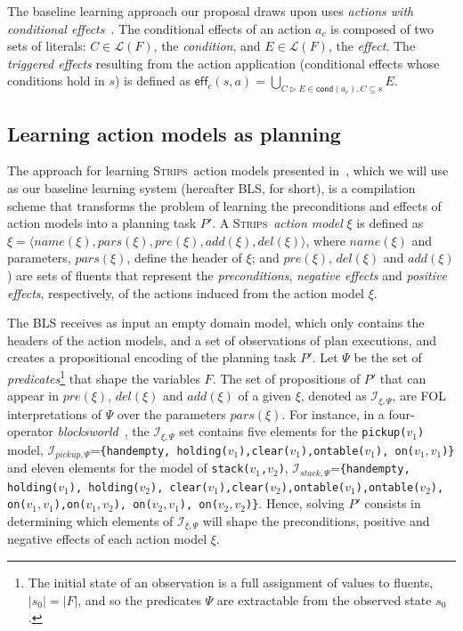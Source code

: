 \documentclass{article}
\newcommand{\tup}[1]{{\langle #1 \rangle}}
\newcommand{\eff}{\mathsf{eff}}     %
\newcommand{\cond}{\mathsf{cond}}   %
\newcommand{\strips}{\textsc{Strips}}
\begin{document}
The baseline learning approach our proposal draws upon uses {\em actions with conditional effects}~\cite{aineto2018learning}. The conditional effects of an action $a_c$ is composed of two sets of literals: $C\in\mathcal{L}(F)$, the {\em condition}, and $E\in\mathcal{L}(F)$, the {\em effect}. The {\em triggered effects} resulting from the action application (conditional effects whose conditions hold in $s$) is defined as $\eff_c(s,a)=\bigcup_{C\rhd E\in\cond(a_c),C\subseteq s} E$.


\subsection{Learning action models as planning}
\label{FAMA}

The approach for learning \strips\ action models presented in~\cite{aineto2018learning}, which we will use as our baseline learning system (hereafter BLS, for short), is a compilation scheme that transforms the problem of learning the preconditions and effects of action models into a planning task $P'$. A \strips\ \emph{action model} $\xi$ is defined as $\xi=\tup{name(\xi),pars(\xi),pre(\xi),add(\xi),del(\xi)}$, where $name(\xi)$ and parameters, $pars(\xi)$, define the header of $\xi$; and $pre(\xi)$, $del(\xi)$ and $add(\xi)$) are sets of fluents that represent the {\em preconditions}, {\em negative effects} and {\em positive effects}, respectively, of the actions induced from the action model $\xi$.

The BLS receives as input an empty domain model, which only contains the headers of the action models, and a set of observations of plan executions, and creates a propositional encoding of the planning task $P'$. Let $\Psi$ be the set of {\em predicates}\footnote{The initial state of an observation is a full assignment of values to fluents, $|s_0|=|F|$, and so the predicates $\Psi$ are extractable from the observed state $s_0$.} that shape the variables $F$. The set of propositions of $P'$ that can appear in $pre(\xi)$, $del(\xi)$ and $add(\xi)$ of a given $\xi$, denoted as ${\mathcal I}_{\xi,\Psi}$, are FOL interpretations of $\Psi$ over the parameters $pars(\xi)$. For instance, in a four-operator {\em blocksworld}~\cite{slaney2001blocks}, the ${\mathcal I}_{\xi,\Psi}$ set contains five elements for the {\small \tt pickup($v_1$)} model, ${\mathcal I}_{pickup,\Psi}$={\small\tt\{handempty, holding($v_1$),clear($v_1$),ontable($v_1$), on($v_1,v_1$)\}} and eleven elements for the model of {\small \tt stack($v_1$,$v_2$)}, ${\mathcal I}_{stack,\Psi}$={\small\tt\{handempty, holding($v_1$), holding($v_2$), clear($v_1$),clear($v_2$),ontable($v_1$),ontable($v_2$), \\
on($v_1,v_1$),on($v_1,v_2$), on($v_2,v_1$), on($v_2,v_2$)\}}. Hence, solving $P'$ consists in determining which elements of ${\mathcal I}_{\xi,\Psi}$ will shape the preconditions, positive and negative effects of each action model $\xi$.
\end{document}
